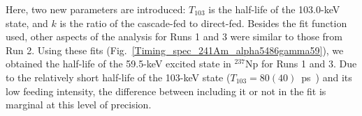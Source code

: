 \documentclass[aps,UTF8,prc,twocolumn,preprintnumbers,amsmath,amssymb,floatfix]{revtex4-2}
\begin{document}
Here, two new parameters are introduced: $T_{103}$ is the half-life of the 103.0-keV state, and $k$ is the ratio of the cascade-fed to direct-fed. Besides the fit function used, other aspects of the analysis for Runs 1 and 3 were similar to those from Run 2. Using these fits (Fig.~\ref{Timing_spec_241Am_alpha5486gamma59}), we obtained the half-life of the 59.5-keV excited state in $^{237}$Np for Runs 1 and 3. Due to the relatively short half-life of the 103-keV state ($T_{103}=80(40)$~ps~\cite{Basunia_NDS2006_A237}) and its low feeding intensity, the difference between including it or not in the fit is marginal at this level of precision. 



\end{document}
